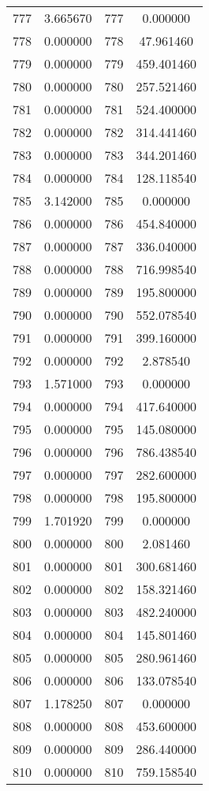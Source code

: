 \documentclass[12pt]{article}
\begin{document}
\begin{longtable}{@{}cccc@{}}
777 & 3.665670 & 777 & 0.000000 \\
778 & 0.000000 & 778 & 47.961460 \\
779 & 0.000000 & 779 & 459.401460 \\
780 & 0.000000 & 780 & 257.521460 \\
781 & 0.000000 & 781 & 524.400000 \\
782 & 0.000000 & 782 & 314.441460 \\
783 & 0.000000 & 783 & 344.201460 \\
784 & 0.000000 & 784 & 128.118540 \\
785 & 3.142000 & 785 & 0.000000 \\
786 & 0.000000 & 786 & 454.840000 \\
787 & 0.000000 & 787 & 336.040000 \\
788 & 0.000000 & 788 & 716.998540 \\
789 & 0.000000 & 789 & 195.800000 \\
790 & 0.000000 & 790 & 552.078540 \\
791 & 0.000000 & 791 & 399.160000 \\
792 & 0.000000 & 792 & 2.878540 \\
793 & 1.571000 & 793 & 0.000000 \\
794 & 0.000000 & 794 & 417.640000 \\
795 & 0.000000 & 795 & 145.080000 \\
796 & 0.000000 & 796 & 786.438540 \\
797 & 0.000000 & 797 & 282.600000 \\
798 & 0.000000 & 798 & 195.800000 \\
799 & 1.701920 & 799 & 0.000000 \\
800 & 0.000000 & 800 & 2.081460 \\
801 & 0.000000 & 801 & 300.681460 \\
802 & 0.000000 & 802 & 158.321460 \\
803 & 0.000000 & 803 & 482.240000 \\
804 & 0.000000 & 804 & 145.801460 \\
805 & 0.000000 & 805 & 280.961460 \\
806 & 0.000000 & 806 & 133.078540 \\
807 & 1.178250 & 807 & 0.000000 \\
808 & 0.000000 & 808 & 453.600000 \\
809 & 0.000000 & 809 & 286.440000 \\
810 & 0.000000 & 810 & 759.158540 \\

\end{longtable}
\end{document}

